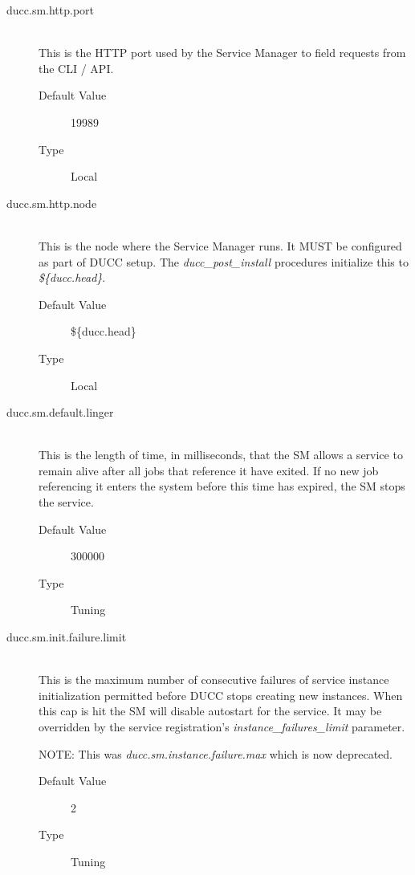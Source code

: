 \begin{description}
      \item[ducc.sm.http.port] \hfill \\
        This is the HTTP port used by the Service Manager to field requests from the CLI / API. 
        \begin{description}          
          \item[Default Value] 19989 
          \item[Type] Local 
        \end{description}
        
      \item[ducc.sm.http.node] \hfill \\
        This is the node where the Service Manager runs. It MUST be configured as part of DUCC 
        setup. The {\em ducc\_post\_install} procedures initialize this to {\em \$\{ducc.head\}}.
        \begin{description}
          \item[Default Value] \$\{ducc.head\}
          \item[Type] Local 
        \end{description}
        
      \item[ducc.sm.default.linger] \hfill \\
        This is the length of time, in milliseconds, that the SM allows a service to remain alive after 
        all jobs that reference it have exited. If no new job referencing it enters the system before this time has 
        expired, the SM stops the service. 
        \begin{description}
          \item[Default Value] 300000
          \item[Type] Tuning 
        \end{description}
        
      \item[ducc.sm.init.failure.limit] \hfill \\
        This is the maximum number of consecutive failures of service instance initialization 
        permitted before DUCC stops creating new instances.  When this cap is hit the SM
        will disable autostart for the service.  It may be overridden by the service
        registration's {\em instance\_failures\_limit} parameter.

        NOTE: This was {\em ducc.sm.instance.failure.max} which is now deprecated.
        \begin{description}
          \item[Default Value] 2
          \item[Type] Tuning 
        \end{description}


\end{description}
